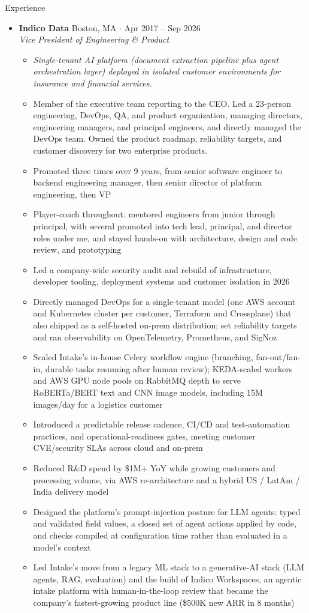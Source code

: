 \documentclass[10pt,oneside]{article}
\newenvironment{ressection}[1]{
  \vspace{4pt}
  {\fontfamily{phv}\selectfont\Large#1}
  \begin{itemize}
    \vspace{3pt}
}{
  \end{itemize}
}
\newcommand{\ressubitem}[1]{
  \vspace{-1pt}
\item \begin{flushleft} #1 \end{flushleft}
}
\newcommand{\rescontext}[1]{
  \vspace{-3pt}
\item[] \begin{flushleft} \textit{\small #1} \end{flushleft}
}
\newcommand{\resscope}[1]{
  \vspace{-3pt}
\item[] \begin{flushleft} #1 \end{flushleft}
}
\newcommand{\resbigitem}[3]{
  \vspace{-5pt}
\item
  \textbf{#1} \hfill #2 \\
  \textit{#3}
}
\newenvironment{ressubsec}[3]{
  \resbigitem{#1}{#2}{#3}
  \vspace{-2pt}
  \begin{itemize}
}{
  \end{itemize}
}
\begin{document}
\begin{ressection}{Experience}

  \begin{ressubsec}{Indico Data}{Boston, MA \; $\cdot$ \; Apr 2017 -- Sep 2026}{Vice President of Engineering \& Product}
    \rescontext{Single-tenant AI platform (document extraction pipeline plus agent orchestration layer) deployed in isolated customer environments for insurance and financial services.}
    \resscope{Member of the executive team reporting to the CEO. Led a 23-person engineering, DevOps, QA, and product organization, managing directors, engineering managers, and principal engineers, and directly managed the DevOps team. Owned the product roadmap, reliability targets, and customer discovery for two enterprise products.}
    \ressubitem{Promoted three times over 9 years, from senior software engineer to backend engineering manager, then senior director of platform engineering, then VP}
    \ressubitem{Player-coach throughout: mentored engineers from junior through principal, with several promoted into tech lead, principal, and director roles under me, and stayed hands-on with architecture, design and code review, and prototyping}
    \ressubitem{Led a company-wide security audit and rebuild of infrastructure, developer tooling, deployment systems and customer isolation in 2026}
    \ressubitem{Directly managed DevOps for a single-tenant model (one AWS account and Kubernetes cluster per customer, Terraform and Crossplane) that also shipped as a self-hosted on-prem distribution; set reliability targets and ran observability on OpenTelemetry, Prometheus, and SigNoz}
    \ressubitem{Scaled Intake's in-house Celery workflow engine (branching, fan-out/fan-in, durable tasks resuming after human review); KEDA-scaled workers and AWS GPU node pools on RabbitMQ depth to serve RoBERTa/BERT text and CNN image models, including 15M images/day for a logistics customer}
    \ressubitem{Introduced a predictable release cadence, CI/CD and test-automation practices, and operational-readiness gates, meeting customer CVE/security SLAs across cloud and on-prem}
    \ressubitem{Reduced R\&D spend by \$1M+ YoY while growing customers and processing volume, via AWS re-architecture and a hybrid US / LatAm / India delivery model}
    \ressubitem{Designed the platform's prompt-injection posture for LLM agents: typed and validated field values, a closed set of agent actions applied by code, and checks compiled at configuration time rather than evaluated in a model's context}
    \ressubitem{Led Intake's move from a legacy ML stack to a generative-AI stack (LLM agents, RAG, evaluation) and the build of Indico Workspaces, an agentic intake platform with human-in-the-loop review that became the company's fastest-growing product line (\$500K new ARR in 8 months)}

\end{ressubsec}
\end{ressection}
\end{document}
